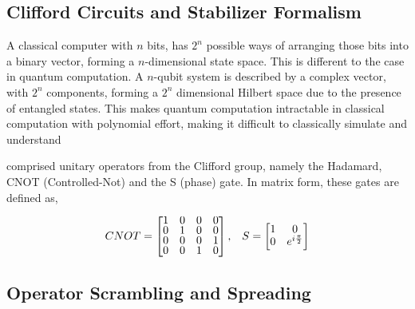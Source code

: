 \subsection{Clifford Circuits and Stabilizer Formalism}
A classical computer with $n$ bits, has $2^n$ possible ways of arranging those bits into a binary vector, forming a $n$-dimensional state space.
This is different to the case in quantum computation. A $n$-qubit system is described by a complex vector, with $2^n$ components, forming a $2^n$ dimensional
Hilbert space due to the presence of entangled states. This makes quantum computation intractable in classical computation with polynomial effort, making it difficult 
to classically simulate and understand 



comprised
unitary operators from the Clifford group, namely the Hadamard, CNOT (Controlled-Not) and the S (phase) gate. In matrix form, these gates are defined as,

\begin{align*}
    CNOT = 
    \renewcommand{\arraystretch}{0.75}
    \begin{bmatrix}
        1 & 0 & 0 & 0 \\
        0 & 1 & 0 & 0 \\
        0 & 0 & 0 & 1 \\
        0 & 0 & 1 & 0 
    \end{bmatrix}, 
    && S = 
    \begin{bmatrix}
        1 & 0 \\
        0 & e^{i\frac{\pi}{2}}
    \end{bmatrix}
\end{align*}












\subsection{Operator Scrambling and Spreading}